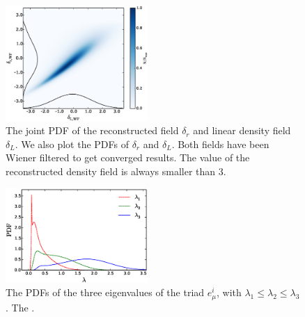 \documentclass[aps,prl,twocolumn,showpacs,superscriptaddress,groupedaddress,nofootinbib]{revtex4}  %
\begin{document}
\begin{figure}[tbp]
\begin{center}
\includegraphics[width=0.48\textwidth]{jointpdf.eps}
\end{center}
\vspace{-0.7cm}
\caption{The joint PDF of the reconstructed field 
    $\delta_r$ and linear density field $\delta_L$. We also plot the 
PDFs of $\delta_r$ and $\delta_L$. Both fields
have been Wiener filtered to get converged results. The value of the 
reconstructed density field is always smaller than 3.}
\label{fig:pdf}
\end{figure}

\begin{figure}[tbp]
\begin{center}
\includegraphics[width=0.48\textwidth]{f5.eps}
\end{center}
\vspace{-0.7cm}
\caption{The PDFs of the three eigenvalues of the triad $e^i_\mu$, 
with $\lambda_1\le\lambda_2\le\lambda_3$. 
The .}
\label{fig:pdf}
\end{figure}
\end{document}
